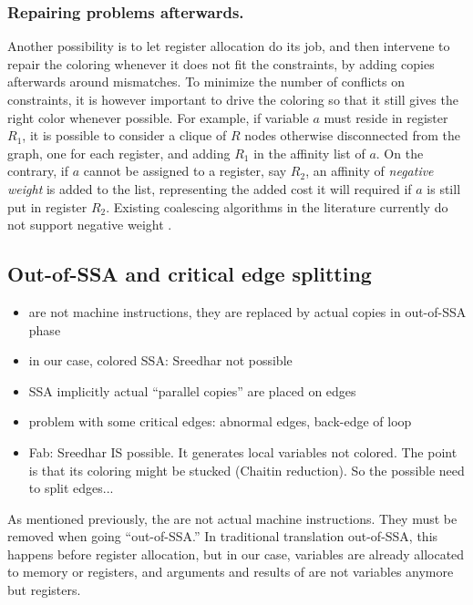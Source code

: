 {\subsubsection{Repairing problems afterwards.}

Another possibility is to let register allocation do its job, and then 
intervene to repair the coloring whenever it does not fit the constraints, by 
adding copies afterwards around mismatches. To minimize the number of conflicts 
on constraints, it is however important to drive the coloring so that it still 
gives the right color whenever possible. For example, if variable $a$ must 
reside in register $R_1$, it is possible to consider a clique of $R$ nodes 
otherwise disconnected from the graph, one for each register, and adding $R_1$ 
in the affinity list of $a$. On the contrary, if $a$ cannot be assigned to a 
register, say $R_2$, an affinity of \emph{negative weight} is added to the 
list, representing the added cost it will required if $a$ is still put in 
register $R_2$. Existing coalescing algorithms in the literature currently do 
not support negative weight .








\subsection{Out-of-SSA and critical edge splitting}

{\sl
\begin{itemize}
  \item \phifuns are not machine instructions, they are replaced by actual 
    copies in out-of-SSA phase
  \item in our case, colored SSA: Sreedhar not possible
  \item SSA implicitly 
    actual ``parallel copies'' are placed on edges
  \item problem with some critical edges: abnormal edges, back-edge of loop
  \item Fab: Sreedhar IS possible. It generates local variables not colored.
The point is that its coloring might be stucked (Chaitin reduction). So the possible need to split edges...
\end{itemize}
}

As mentioned previously, the \phifuns are not actual machine instructions.  
They must be removed when going ``out-of-SSA.'' In traditional translation 
out-of-SSA, this happens before register allocation, but in our case, variables 
are already allocated to memory or registers, and arguments and results of 
\phifuns are not variables anymore but registers.


}
